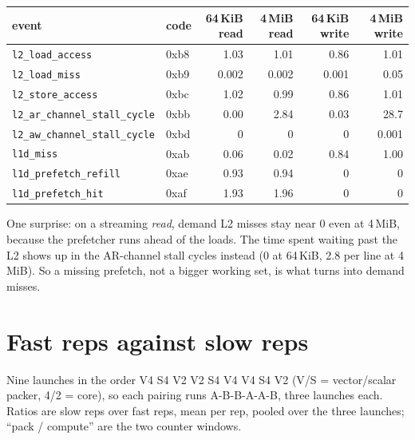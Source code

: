 \documentclass[10pt,a4paper]{article}
\begin{document}
\begin{center}\small
\begin{tabular}{@{}llrrrr@{}}
\toprule
event & code & 64\,KiB read & 4\,MiB read & 64\,KiB write & 4\,MiB write \\
\midrule
\texttt{l2\_load\_access} & 0xb8 & 1.03 & 1.01 & 0.86 & 1.01 \\
\texttt{l2\_load\_miss} & 0xb9 & 0.002 & 0.002 & 0.001 & 0.05 \\
\texttt{l2\_store\_access} & 0xbc & 1.02 & 0.99 & 0.86 & 1.01 \\
\texttt{l2\_ar\_channel\_stall\_cycle} & 0xbb & 0.00 & 2.84 & 0.03 & 28.7 \\
\texttt{l2\_aw\_channel\_stall\_cycle} & 0xbd & 0 & 0 & 0 & 0.001 \\
\texttt{l1d\_miss} & 0xab & 0.06 & 0.02 & 0.84 & 1.00 \\
\texttt{l1d\_prefetch\_refill} & 0xae & 0.93 & 0.94 & 0 & 0 \\
\texttt{l1d\_prefetch\_hit} & 0xaf & 1.93 & 1.96 & 0 & 0 \\
\bottomrule
\end{tabular}
\end{center}
One surprise: on a streaming \emph{read}, demand L2 misses stay near 0 even at 4\,MiB, because the prefetcher runs
ahead of the loads. The time spent waiting past the L2 shows up in the AR-channel stall cycles instead (0 at 64\,KiB,
2.8 per line at 4\,MiB). So a missing prefetch, not a bigger working set, is what turns into demand misses.

\section{Fast reps against slow reps}
Nine launches in the order V4 S4 V2 \textbar{} V2 S4 V4 \textbar{} V4 S4 V2 (V/S = vector/scalar packer, 4/2 =
core), so each pairing runs A-B-B-A-A-B, three launches each. Ratios are slow reps over fast reps, mean per rep,
pooled over the three launches; ``pack / compute'' are the two counter windows.
\end{document}
